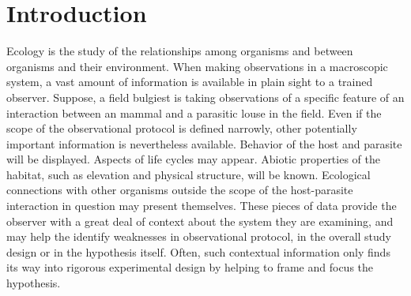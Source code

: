 \section{Introduction}

Ecology is the study of the relationships among organisms and between organisms and their environment. When making observations in a macroscopic system, a vast amount of information is available in plain sight to a trained observer. Suppose, a field bulgiest is taking observations of a specific feature of an interaction between an mammal and a parasitic louse in the field. Even if the scope of the observational protocol is defined narrowly, other potentially important information is nevertheless available. Behavior of the host and parasite will be displayed. Aspects of life cycles may appear. Abiotic properties of the habitat, such as elevation and physical structure, will be known. Ecological connections with other organisms outside the scope of the host-parasite interaction in question may present themselves. These pieces of data provide the observer with a great deal of context about the system they are examining, and may help the identify weaknesses in observational protocol, in the overall study design or in the hypothesis itself. Often, such contextual information only finds its way into rigorous experimental design by helping to frame and focus the hypothesis. 





